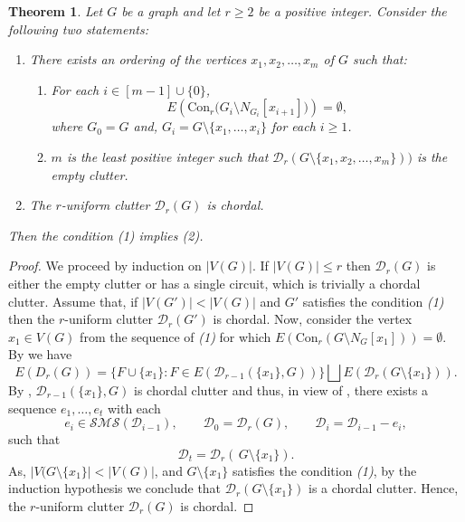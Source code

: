\documentclass[12pt,reqno]{amsart}
\newtheorem{theorem}[proposition]{Theorem}
\theoremstyle{definition}
\newcommand{\Con}{{\mathrm{Con}}}
\def\D{\mathcal{D}}
\def\SMS{\mathcal{SMS}}
\begin{document}
\begin{theorem}\label{chordal 4}
    Let $G$ be a graph and let $r \ge 2$ be a positive integer. 
    Consider the following two statements:
    \begin{enumerate}
        \item There exists an ordering of the vertices $x_1, x_2, \ldots, x_m$ of $G$ such that:
        \begin{enumerate}
            \item For each $i \in [m-1] \cup \{0\}$,
            \[
                E\left(\Con_r\bigl(G_i \setminus N_{G_i}[x_{i+1}]\bigr)\right) = \emptyset,
            \]
            where $G_0 = G$ and, $G_i = G \setminus \{x_1, \ldots, x_i\}$ for each $i \ge 1$.
            
            \item $m$ is the least positive integer such that $\D_r(G \setminus \{x_1,x_2,\ldots,x_m\}))$ is the empty clutter.
        \end{enumerate}
        \item The $r$-uniform clutter $\D_r(G)$ is chordal. 
    \end{enumerate}
    Then the condition \textup{(1)} implies \textup{(2)}.
\end{theorem}
\begin{proof} 
    We proceed by induction on $|V(G)|$. If $|V(G)| \le r$ then $\D_r(G)$ is either the empty clutter or has a single circuit, which is trivially a chordal clutter. Assume that, if $|V(G')| < |V(G)|$ and $G'$ satisfies the condition \emph{(1)} then the $r$-uniform clutter $\D_r(G')$ is chordal. Now, consider the vertex $x_1 \in V(G)$ from the sequence of \emph{(1)} for which $E(\Con_r(G \setminus N_G[x_1])) = \emptyset$. By  we have
    \[E(D_r(G)) = \{F \cup \{x_1\} : F \in E(\D_{r-1}(\{x_1\},G))\} \bigsqcup E(\D_r(G\setminus \{x_1\})).\] By , $\D_{r-1}(\{x_1\},G)$ is chordal clutter and thus, in view of , there exists a sequence $e_1, \ldots, e_t$
with each 
\[e_i \in \SMS(\D_{i-1}), \qquad \D_0 = \D_r(G), \qquad \D_i = \D_{i-1} - e_i,\] such that 
\[
\D_t = \D_r(\, G \setminus \{x_1\}).
\] As, $|V(G \setminus \{x_1\}| < |V(G)|$, and $G \setminus \{x_1\}$ satisfies the condition \emph{(1)}, by the induction hypothesis we conclude that $\D_r(G \setminus \{x_1\})$ is a chordal clutter. Hence, the $r$-uniform clutter $\D_r(G)$ is chordal. 
\end{proof}
\end{document}
